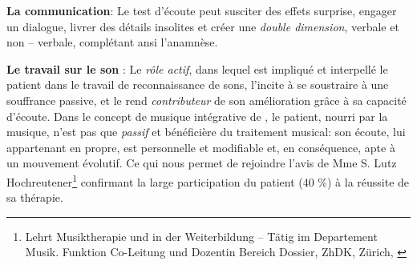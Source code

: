 



\textbf{La communication}:
Le test d'écoute
  peut susciter des effets surprise, engager un dialogue, livrer des détails
 insolites et créer une \textit{double dimension}, verbale et
 non -- verbale, complétant ansi l'anamnèse.



 \textbf{Le travail sur le son} :
 Le \emph{rôle actif}, dans lequel est impliqué et interpellé le patient dans le travail
de reconnaissance de sons, l'incite à se soustraire à une souffrance
passive, et  le rend  \textit{contributeur} de son amélioration grâce à sa capacité
d'écoute.
Dans le concept de musique intégrative de \autocite[Cf.]
        {vrait_musicotherapie_2018}, le patient, nourri par
        la musique, n'est pas que \textit{passif }et
        bénéficière du traitement musical: son écoute, lui
        appartenant en propre, est personnelle et modifiable %
        et, en conséquence, apte à un mouvement évolutif.
Ce qui nous permet de rejoindre l'avis de Mme S. Lutz
 Hochreutener\footnote{Lehrt Musiktherapie und in der Weiterbildung – Tätig
 im Departement Musik. Funktion Co-Leitung und Dozentin Bereich
  Dossier, ZhDK, Zürich, \autocite {lutz_hochreutener_spiel_2009} }
 confirmant la large participation du patient (40 \%) à la réussite de sa thérapie.




